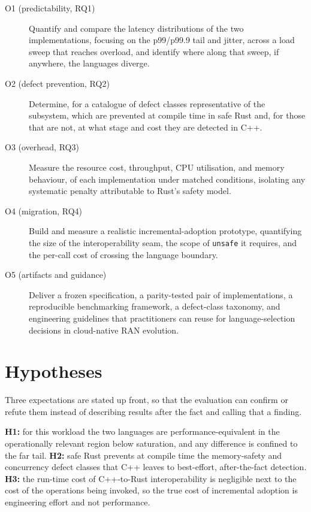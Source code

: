 \documentclass[english,twoside,openright,a4paper,censored,csm,software-track-2020]{HYthesisML}
\begin{document}
\begin{description}
  \item[O1 (predictability, RQ1)] Quantify and compare the latency distributions of the two
        implementations, focusing on the p99/p99.9 tail and jitter, across a load sweep that
        reaches overload, and identify where along that sweep, if anywhere, the languages
        diverge.
  \item[O2 (defect prevention, RQ2)] Determine, for a catalogue of defect classes
        representative of the subsystem, which are prevented at compile time in safe Rust and,
        for those that are not, at what stage and cost they are detected in C++.
  \item[O3 (overhead, RQ3)] Measure the resource cost, throughput, CPU utilisation, and memory
        behaviour, of each implementation under matched conditions, isolating any systematic
        penalty attributable to Rust's safety model.
  \item[O4 (migration, RQ4)] Build and measure a realistic incremental-adoption prototype,
        quantifying the size of the interoperability seam, the scope of \texttt{unsafe} it
        requires, and the per-call cost of crossing the language boundary.
  \item[O5 (artifacts and guidance)] Deliver a frozen specification, a parity-tested pair of
        implementations, a reproducible benchmarking framework, a defect-class taxonomy, and
        engineering guidelines that practitioners can reuse for language-selection decisions in
        cloud-native RAN evolution.
\end{description}

\section{Hypotheses}
Three expectations are stated up front, so that the evaluation can confirm or refute them instead
of describing results after the fact and calling that a finding.

\textbf{H1:} for this workload the two languages are performance-equivalent in the operationally
relevant region below saturation, and any difference is confined to the far tail. \textbf{H2:}
safe Rust prevents at compile time the memory-safety and concurrency defect classes that C++
leaves to best-effort, after-the-fact detection. \textbf{H3:} the run-time cost of C++-to-Rust
interoperability is negligible next to the cost of the operations being invoked, so the true cost
of incremental adoption is engineering effort and not performance.
\end{document}
